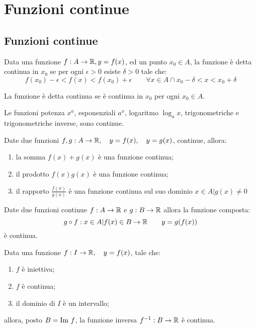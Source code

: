 
\chapter{Funzioni continue} %

\label{ch:continue} %


\section{Funzioni continue}

Data una funzione $f:A\rightarrow \mathbb{R}, y = f(x)$, ed un punto $x_0 \in A $, la funzione è detta continua in $x_0$ se per ogni $\epsilon > 0$ esiste $\delta > 0$ tale che:
\[f(x_0)-\epsilon < f(x) < f(x_0) + \epsilon \qquad \forall x \in A \cap x_0 - \delta < x < x_0 + \delta \]

La funzione è detta continua se è continua in $x_0$ per ogni $x_0 \in A$.

\begin{teo}
Le funzioni potenza $x^a$, esponenziali $a^x$, logaritmo $\log_a x$, trigonometriche e trigonometriche inverse, sono continue.
\end{teo}

\begin{teo}
Date due funzioni $f,g: A \rightarrow \mathbb{R}, \quad y=f(x), \quad y=g(x)$, continue, allora:
\begin{enumerate}
\item la somma $f(x) + g(x)$ è una funzione continua;
\item il prodotto $f(x)g(x)$ è una funzione continua;
\item il rapporto $\frac{f(x)}{g(x)}$ è una funzione continua sul suo dominio ${x\in A | g(x) \neq 0 }$
\end{enumerate}
\end{teo}

\begin{teo}
Date due funzioni continue $f:A\rightarrow \mathbb{R}$ e $g:B\rightarrow \mathbb{R}$ allora la funzione composta:
\[g\circ f:{x\in A |f(x) \in B} \rightarrow \mathbb{R} \qquad y=g(f(x))\]
è continua.
\end{teo}

\begin{teo}
Data una funzione $f:I\rightarrow \mathbb{R}, \quad y=f(x)$, tale che:
\begin{enumerate}
\item $f$ è iniettiva;
\item $f$ è continua;
\item il dominio di $I$ è un intervallo;
\end{enumerate}
allora, posto $B = \text{Im } f$, la funzione inversa $f^{-1}:B\rightarrow \mathbb{R}$ è continua.
\end{teo}
